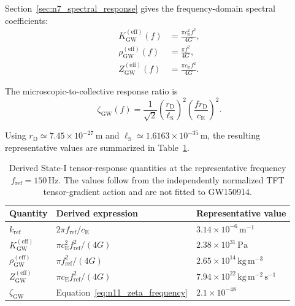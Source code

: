 Section~\ref{sec:n7_spectral_response} gives the frequency-domain spectral coefficients:
\begin{align}
    K_{\mathrm{GW}}^{(\mathrm{eff})}(f) &= \frac{ \pi c_{\mathrm{E}}^{2}f^{2} }{ 4G }, \label{eq:n11_spectral_stiffness_frequency} \\
    \rho_{\mathrm{GW}}^{(\mathrm{eff})}(f) &= \frac{ \pi f^{2} }{ 4G }, \label{eq:n11_spectral_density_frequency} \\
    Z_{\mathrm{GW}}^{(\mathrm{eff})}(f) &= \frac{ \pi c_{\mathrm{E}}f^{2} }{ 4G }. \label{eq:n11_spectral_impedance_frequency}
\end{align}

The microscopic-to-collective response ratio is
\begin{equation}
    \zeta_{\mathrm{GW}}(f) = \frac{1}{\sqrt{2}} \left( \frac{ r_{\mathrm{D}} }{ \ell_{\mathrm{S}} } \right)^{2} \left( \frac{ fr_{\mathrm{D}} }{ c_{\mathrm{E}} } \right)^{2}.
    \label{eq:n11_zeta_frequency}
\end{equation}

Using $r_{\mathrm{D}} \simeq 7.45\times10^{-27}\,\mathrm{m}$ and $\ell_{\mathrm{S}} \simeq 1.6163\times10^{-35}\,\mathrm{m}$, the resulting representative values are summarized in Table~\ref{tab:n11_event_band_response}.

\begin{table}[H]
    \centering
    \caption{Derived State-I tensor-response quantities at the representative frequency $f_{\mathrm{ref}}=150\,\mathrm{Hz}$. The values follow from the independently normalized TFT tensor-gradient action and are not fitted to GW150914.}
    \label{tab:n11_event_band_response}
    \renewcommand{\arraystretch}{1.4}
    \small
    \begin{tabular}{lll}
        \toprule
        \textbf{Quantity} & \textbf{Derived expression} & \textbf{Representative value} \\
        \midrule
        $k_{\mathrm{ref}}$ & $2\pi f_{\mathrm{ref}}/c_{\mathrm{E}}$ & $3.14\times10^{-6}\,\mathrm{m^{-1}}$ \\
        $K_{\mathrm{GW}}^{(\mathrm{eff})}$ & $\pi c_{\mathrm{E}}^{2}f_{\mathrm{ref}}^{2}/(4G)$ & $2.38\times10^{31}\,\mathrm{Pa}$ \\
        $\rho_{\mathrm{GW}}^{(\mathrm{eff})}$ & $\pi f_{\mathrm{ref}}^{2}/(4G)$ & $2.65\times10^{14}\,\mathrm{kg\,m^{-3}}$ \\
        $Z_{\mathrm{GW}}^{(\mathrm{eff})}$ & $\pi c_{\mathrm{E}}f_{\mathrm{ref}}^{2}/(4G)$ & $7.94\times10^{22}\,\mathrm{kg\,m^{-2}\,s^{-1}}$ \\
        $\zeta_{\mathrm{GW}}$ & Equation~\eqref{eq:n11_zeta_frequency} & $2.1\times10^{-48}$ \\
        \bottomrule
    \end{tabular}
\end{table}

